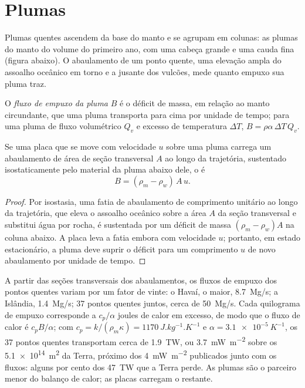 \section{Plumas}

Plumas quentes ascendem da base do manto e se agrupam em colunas: as plumas do manto
do volume do primeiro ano, com uma cabeça grande e uma cauda fina (figura abaixo).
O abaulamento de um ponto quente, uma elevação ampla do assoalho oceânico em torno e a jusante
dos vulcões, mede quanto empuxo sua pluma traz.

\begin{definition}\label{def:b3:mantle-convection:buoyancy-flux}
O \emph{fluxo de empuxo da pluma} $B$ é o déficit
de massa, em relação ao manto circundante, que uma pluma transporta para cima por
unidade de tempo; para uma pluma de fluxo volumétrico $Q_v$ e excesso de temperatura $\Delta T$,
$B = \rho\alpha\,\Delta T\,Q_v$.
\end{definition}

\begin{proposition}\label{prop:b3:mantle-convection:swell}
Se uma placa que se move com velocidade $u$ sobre uma pluma carrega um abaulamento de
área de seção transversal $A$ ao longo da trajetória, sustentado isostaticamente pelo
material da pluma abaixo dele, o  é
\[
  B = (\rho_m - \rho_w)\,A\,u .
\]
\end{proposition}

\begin{proof}
Por isostasia, uma fatia de abaulamento de comprimento unitário ao longo da trajetória, que eleva
o assoalho oceânico sobre a área $A$ da seção transversal e substitui água
por rocha, é sustentada por um déficit de massa $(\rho_m - \rho_w)A$ na coluna abaixo.
A placa leva a fatia embora com velocidade $u$; portanto, em estado estacionário, a
pluma deve suprir o déficit para um comprimento $u$ de novo abaulamento por unidade de tempo.
\end{proof}

A partir das seções transversais dos abaulamentos, os fluxos de empuxo dos pontos quentes variam
por um fator de vinte: o Havaí, o maior, \qty{8.7}{Mg/s}; a Islândia,
\qty{1.4}{Mg/s}; 37 pontos quentes juntos, cerca de \qty{50}{Mg/s}. Cada quilograma de
empuxo corresponde a $c_p/\alpha$ joules de calor em excesso, de modo que o fluxo de calor é $c_pB/\alpha$;
com $c_p = k/(\rho_m\kappa) = \qty{1170}{J.kg^{-1}.K^{-1}}$ e $\alpha =
\qty{3.1e-5}{K^{-1}}$, os 37 pontos quentes transportam cerca de \qty{1.9}{TW}, ou
\qty{3.7}{mW.m^{-2}} sobre os \qty{5.1e14}{m^2} da Terra, próximo dos
\qty{4}{mW.m^{-2}} publicados junto com os fluxos: alguns por cento dos
\qty{47}{TW} que a Terra perde. As plumas são o parceiro menor do balanço
de calor; as placas carregam o restante.

